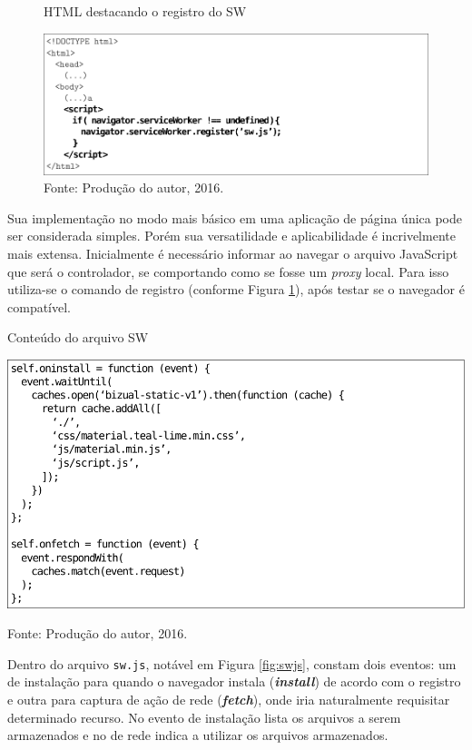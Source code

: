 \documentclass[
	12pt,
	openright,
	oneside, %
	a4paper,
	chapter=TITLE,
	section=TITLE,
	english,
	brazil %
	]{abntex2-udesc}
\begin{document}
\begin{figure}[h]
\caption{HTML destacando o registro do SW}\label{fig:swregister}
\centering
\includegraphics{figures/html.pdf}
\caption*{\footnotesize Fonte: Produção do autor, 2016.}
\end{figure}

Sua implementação no modo mais básico em uma aplicação de página única pode ser considerada simples. Porém sua versatilidade e aplicabilidade é incrivelmente mais extensa. Inicialmente é necessário informar ao navegar o arquivo JavaScript que será o controlador, se comportando como se fosse um \textit{proxy} local. Para isso utiliza-se o comando de registro (conforme Figura \ref{fig:swregister}), após testar se o navegador é compatível.

\begin{quadro}[h]
\caption{Conteúdo do arquivo SW}\label{fig:swjs}
\centering
\centering
\includegraphics{figures/sw.pdf}
\caption*{\ifdraft{\color{green}}{}\footnotesize Fonte: Produção do autor, 2016.}
\end{quadro}

Dentro do arquivo \texttt{sw.js}, notável em Figura \ref{fig:swjs}, constam dois eventos: um de instalação para quando o navegador instala (\textbf{\textit{install}}) de acordo com o registro e outra para captura de ação de rede (\textbf{\textit{fetch}}), onde iria naturalmente requisitar determinado recurso. No evento de instalação lista os arquivos a serem armazenados e no de rede indica a utilizar os arquivos armazenados.
\end{document}
